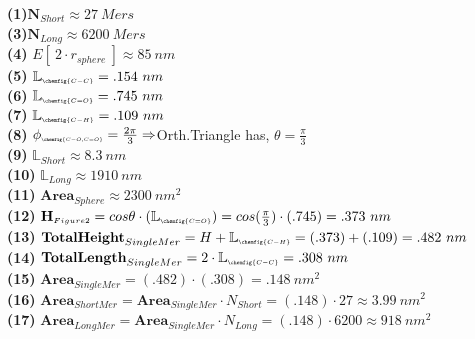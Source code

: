 \documentclass[10pt,letterpaper]{article}
\begin{document}
\noindent \textbf{(1)}$\textbf{N}_{Short} \approx 27~Mers$\\
\textbf{(3)}$\textbf{N}_{Long} \approx 6200~Mers$\\
\textbf{(4)} $E[~2\cdot r_{sphere}~]\approx 85~nm$\\
\textbf{(5)} $\mathbb{L}_{\scalebox{.82}{$\scriptscriptstyle \chemfig{C-C}$}}=.154~nm$\\
\textbf{(6)} $\mathbb{L}_{\scalebox{.82}{$\scriptscriptstyle \chemfig{C=O}$}}=.745~nm$\\
\textbf{(7)} $\mathbb{L}_{\scalebox{.82}{$\scriptscriptstyle \chemfig{C-H}$}}=.109~nm$\\
\textbf{(8)} $\phi_{\scalebox{.7}{$\scriptscriptstyle \chemfig{C-O,C=O}$}}=\frac{2\pi}{3}\Rightarrow$Orth.Triangle has, $\theta=\frac{\pi}{3}$\\
\textbf{(9)} $\mathbb{L}_{\scriptscriptstyle Short}\approx8.3~nm$\\
\textbf{(10)} $\mathbb{L}_{\scriptscriptstyle Long}\approx 1910~nm$\\
\textbf{(11)} $\textbf{Area}_{\scriptscriptstyle Sphere} \approx 2300~nm^2$\\
\textbf{(12)} $\textbf{H}_{\scriptscriptstyle Figure2}=cos\theta \cdot (\mathbb{L}_{\scalebox{.82}{$\scriptscriptstyle \chemfig{C=O}$}})=cos(\frac{\pi}{3}) \cdot(.745)=.373~nm$\\
\textbf{(13)} $\textbf{TotalHeight}_{SingleMer}=H+\mathbb{L}_{\scalebox{.82}{$\scriptscriptstyle \chemfig{C-H}$}}=(.373)+(.109)=.482~nm$\\
\textbf{(14)} $\textbf{TotalLength}_{SingleMer} = 2 \cdot \mathbb{L}_{\scalebox{.82}{$\scriptscriptstyle \chemfig{C-C}$}} = .308~nm$\\
\textbf{(15)} $\textbf{Area}_{\scriptscriptstyle SingleMer} =(.482) \cdot(.308) =.148~nm^2$\\
\textbf{(16)} $\textbf{Area}_{\scriptscriptstyle ShortMer} =\textbf{Area}_{\scriptscriptstyle SingleMer}\cdot N_{Short}=(.148)\cdot 27\approx 3.99 ~nm^2$\\
\textbf{(17)} $\textbf{Area}_{\scriptscriptstyle LongMer} =\textbf{Area}_{\scriptscriptstyle SingleMer}\cdot N_{Long}=(.148)\cdot 6200 \approx 918~nm^2$





\newpage

\end{document}
